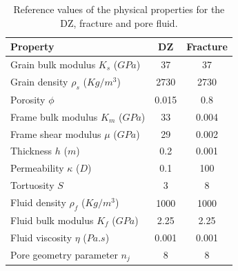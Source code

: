 \documentclass[draft]{agujournal2019}
\begin{document}
\begin{table}[!ht]
  \caption{Reference values of the physical properties for the DZ, fracture and pore fluid.}
\begin{center}
  \begin{tabular}{ | l | c | c| }
    \hline
    Property & DZ & Fracture \\ \hline
    Grain bulk modulus $K_s$ ($GPa$) & 37 & 37 \\ 
    Grain density $\rho_s$ ($Kg/m^3$) & 2730 & 2730 \\
    Porosity $\phi$ & 0.015 & 0.8 \\
    Frame bulk modulus $K_m$ ($GPa$) & 33 & 0.004\\ 
    Frame shear modulus $\mu$ ($GPa$) & 29 & 0.002 \\
    Thickness $h$ ($m$) & 0.2 & 0.001\\ 
    Permeability $\kappa$ ($D$) & 0.1 & 100\\
    Tortuosity $S$ & 3 & 8\\
    Fluid density $\rho_f$ ($Kg/m^3$) & 1000 & 1000\\
    Fluid bulk modulus $K_f$ ($GPa$) & 2.25 & 2.25\\
    Fluid viscosity $\eta$ ($Pa.s$)& 0.001 & 0.001\\
    Pore geometry parameter $n_j$ & 8 & 8\\
    \hline
  \end{tabular}
  \label{table:1}
\end{center}
\end{table}
\end{document}
